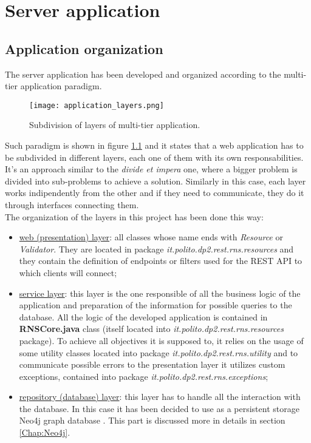\chapter{Server application}
\section{Application organization}
The server application has been developed and organized according to the multi-tier application paradigm.
\begin{figure}[!htb]
   \centering
   \texttt{[image: application\_layers.png]}
   \caption{Subdivision of layers of multi-tier application.}\label{Fig:AppMultiTier}
\end{figure}
Such paradigm is shown in figure \ref{Fig:AppMultiTier} and it states that a web application has to be subdivided in different layers, each one of them with its own responsabilities. It's an approach similar to the \textit{divide et impera} one, where a bigger problem is divided into sub-problems to achieve a solution. Similarly in this case, each layer works indipendently from the other and if they need to communicate, they do it through interfaces connecting them.\\
The organization of the layers in this project has been done this way:
\begin{itemize}
  \item \underline{web (presentation) layer}: all classes whose name ends with \textit{Resource} or \textit{Validator}. They are located in package \textit{it.polito.dp2.rest.rns.resources} and they contain the definition of endpoints or filters used for the REST API to which clients will connect;
  \item \underline{service layer}: this layer is the one responsible of all the business logic of the application and preparation of the information for possible queries to the database. All the logic of the developed application is contained in \textbf{RNSCore.java} class (itself located into \textit{it.polito.dp2.rest.rns.resources} package). To achieve all objectives it is supposed to, it relies on the usage of some utility classes located into package \textit{it.polito.dp2.rest.rns.utility} and to communicate possible errors to the presentation layer it utilizes custom exceptions, contained into package \textit{it.polito.dp2.rest.rns.exceptions};
  \item \underline{repository (database) layer}: this layer has to handle all the interaction with the database. In this case it has been decided to use as a persistent storage Neo4j graph database \cite{neo4j}. This part is discussed more in details in section \ref{Chap:Neo4j}.
\end{itemize}
